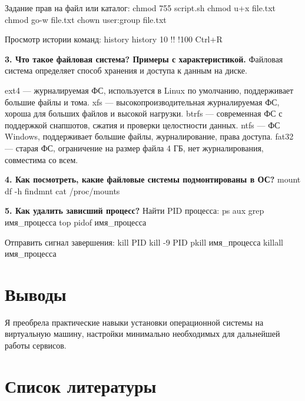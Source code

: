 \documentclass[
  12pt,
  a4paper,
  DIV=11,
  numbers=noendperiod]{scrreprt}
\begin{document}
Задание прав на файл или каталог: chmod 755 script.sh chmod u+x file.txt
chmod go-w file.txt chown user:group file.txt

Просмотр истории команд: history history 10 !! !100 Ctrl+R

\textbf{3. Что такое файловая система? Примеры с характеристикой.}
Файловая система определяет способ хранения и доступа к данным на диске.

ext4 --- журналируемая ФС, используется в Linux по умолчанию,
поддерживает большие файлы и тома. xfs --- высокопроизводительная
журналируемая ФС, хороша для больших файлов и высокой нагрузки. btrfs
--- современная ФС с поддержкой снапшотов, сжатия и проверки целостности
данных. ntfs --- ФС Windows, поддерживает большие файлы, журналирование,
права доступа. fat32 --- старая ФС, ограничение на размер файла 4 ГБ,
нет журналирования, совместима со всем.

\textbf{4. Как посмотреть, какие файловые системы подмонтированы в ОС?}
mount df -h findmnt cat /proc/mounts

\textbf{5. Как удалить зависший процесс?} Найти PID процесса: ps aux
\textbar{} grep имя\_процесса top pidof имя\_процесса

Отправить сигнал завершения: kill PID kill -9 PID pkill имя\_процесса
killall имя\_процесса

\chapter{Выводы}\label{ux432ux44bux432ux43eux434ux44b}

Я преобрела практические навыки установки операционной системы на
виртуальную машину, настройки минимально необходимых для дальнейшей
работы сервисов.

\chapter*{Список
литературы}\label{ux441ux43fux438ux441ux43eux43a-ux43bux438ux442ux435ux440ux430ux442ux443ux440ux44b}

\printbibliography[heading=none]
\end{document}

